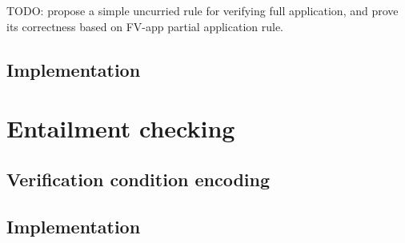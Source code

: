 TODO: propose a simple uncurried rule for verifying full application, and prove its correctness based on FV-app partial application rule.

\subsection{Implementation}



\section{Entailment checking}

\subsection{Verification condition encoding}


\subsection{Implementation}



